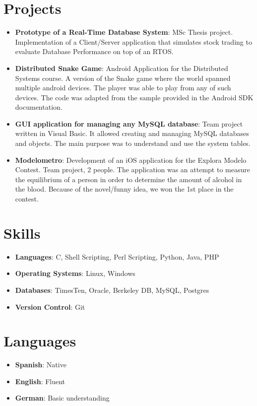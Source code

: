 \documentclass[letterpaper,11pt]{article}
\newcommand{\resumeItem}[2]{
  \item\small{
    \textbf{#1}{: #2 \vspace{-2pt}}
  }
}
\newcommand{\resumeSubItem}[2]{\resumeItem{#1}{#2}\vspace{-4pt}}
\newcommand{\resumeSubHeadingListStart}{\begin{itemize}[leftmargin=*]}
\newcommand{\resumeSubHeadingListEnd}{\end{itemize}}
\begin{document}
\section{Projects}
  \resumeSubHeadingListStart
    \resumeSubItem{Prototype of a Real-Time Database System}
      {MSc Thesis project. Implementation of a Client/Server application that simulates stock trading to evaluate Database Performance on top of an RTOS.}
    \resumeSubItem{Distributed Snake Game}
      {Android Application for the Distributed Systems course. A version of the Snake game where the world spanned multiple android devices. The player was able to play from any of such devices. The code was adapted from the sample provided in the Android SDK documentation.}
    \resumeSubItem{GUI application for managing any MySQL database}
      {Team project written in Visual Basic. It allowed creating and managing MySQL databases and objects. The main purpose was to understand and use the system tables.}
    \resumeSubItem{Modelometro}
      {Development of an iOS application for the Explora Modelo Contest. Team project, 2 people. The application was an attempt to measure the equilibrium of a person in order to determine the amount of alcohol in the blood. Because of the novel/funny idea, we won the 1st place in the contest.}
  \resumeSubHeadingListEnd

%
\section{Skills}
  \resumeSubHeadingListStart
    \resumeSubItem{Languages}
      {C, Shell Scripting, Perl Scripting, Python, Java, PHP}
    \resumeSubItem{Operating Systems}
      {Linux, Windows}
    \resumeSubItem{Databases}
      {TimesTen, Oracle, Berkeley DB, MySQL, Postgres}
    \resumeSubItem{Version Control}
      {Git}
  \resumeSubHeadingListEnd


%
\section{Languages}
  \resumeSubHeadingListStart
    \resumeSubItem{Spanish}{Native}
    \resumeSubItem{English}{Fluent}
    \resumeSubItem{German}{Basic understanding}
  \resumeSubHeadingListEnd


\end{document}
